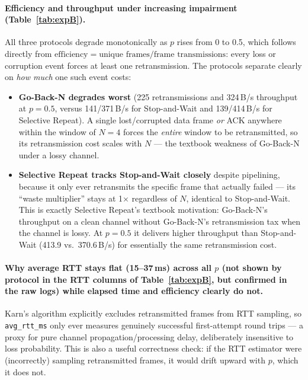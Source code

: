 \documentclass[11pt]{article}
\begin{document}
\paragraph{Efficiency and throughput under increasing impairment (Table~\ref{tab:expB}).}
All three protocols degrade monotonically as $p$ rises from 0 to 0.5, which follows directly
from $\text{efficiency} = \text{unique frames} / \text{frame transmissions}$: every loss or
corruption event forces at least one retransmission. The protocols separate clearly on
\emph{how much} one such event costs:
\begin{itemize}[leftmargin=1.6em]
  \item \textbf{Go-Back-N degrades worst} (225 retransmissions and 324\,B/s throughput at
  $p=0.5$, versus 141/371\,B/s for Stop-and-Wait and 139/414\,B/s for Selective Repeat).
  A single lost/corrupted data frame \emph{or} ACK anywhere within the window of $N{=}4$
  forces the \emph{entire} window to be retransmitted, so its retransmission cost scales
  with $N$ — the textbook weakness of Go-Back-N under a lossy channel.
  \item \textbf{Selective Repeat tracks Stop-and-Wait closely} despite pipelining, because
  it only ever retransmits the specific frame that actually failed — its ``waste
  multiplier'' stays at 1$\times$ regardless of $N$, identical to Stop-and-Wait. This is
  exactly Selective Repeat's textbook motivation: Go-Back-N's throughput on a clean channel
  without Go-Back-N's retransmission tax when the channel is lossy. At $p=0.5$ it delivers
  higher throughput than Stop-and-Wait (413.9 vs.\ 370.6\,B/s) for essentially the same
  retransmission cost.
\end{itemize}

\paragraph{Why average RTT stays flat (15--37\,ms) across all $p$ (not shown by protocol in
the RTT columns of Table~\ref{tab:expB}, but confirmed in the raw logs) while elapsed time
and efficiency clearly do not.} Karn's algorithm explicitly excludes retransmitted frames
from RTT sampling, so \texttt{avg\_rtt\_ms} only ever measures genuinely successful
first-attempt round trips — a proxy for pure channel propagation/processing delay,
deliberately insensitive to loss probability. This is also a useful correctness check: if
the RTT estimator were (incorrectly) sampling retransmitted frames, it would drift upward
with $p$, which it does not.
\end{document}
